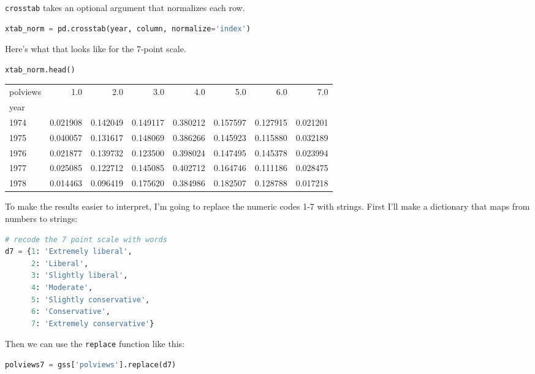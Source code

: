 \passthrough{\lstinline!crosstab!} takes an optional argument that
normalizes each row.

\begin{lstlisting}[language=Python,style=source]
xtab_norm = pd.crosstab(year, column, normalize='index')
\end{lstlisting}

Here's what that looks like for the 7-point scale.

\begin{lstlisting}[language=Python,style=source]
xtab_norm.head()
\end{lstlisting}

\begin{tabular}{lrrrrrrr}
\toprule
polviews &       1.0 &       2.0 &       3.0 &       4.0 &       5.0 &       6.0 &       7.0 \\
year &           &           &           &           &           &           &           \\
\midrule
1974 &  0.021908 &  0.142049 &  0.149117 &  0.380212 &  0.157597 &  0.127915 &  0.021201 \\
1975 &  0.040057 &  0.131617 &  0.148069 &  0.386266 &  0.145923 &  0.115880 &  0.032189 \\
1976 &  0.021877 &  0.139732 &  0.123500 &  0.398024 &  0.147495 &  0.145378 &  0.023994 \\
1977 &  0.025085 &  0.122712 &  0.145085 &  0.402712 &  0.164746 &  0.111186 &  0.028475 \\
1978 &  0.014463 &  0.096419 &  0.175620 &  0.384986 &  0.182507 &  0.128788 &  0.017218 \\
\bottomrule
\end{tabular}

To make the results easier to interpret, I'm going to replace the
numeric codes 1-7 with strings. First I'll make a dictionary that maps
from numbers to strings:

\begin{lstlisting}[language=Python,style=source]
# recode the 7 point scale with words
d7 = {1: 'Extremely liberal', 
      2: 'Liberal', 
      3: 'Slightly liberal', 
      4: 'Moderate', 
      5: 'Slightly conservative', 
      6: 'Conservative', 
      7: 'Extremely conservative'}
\end{lstlisting}

Then we can use the \passthrough{\lstinline!replace!} function like
this:

\begin{lstlisting}[language=Python,style=source]
polviews7 = gss['polviews'].replace(d7)
\end{lstlisting}

